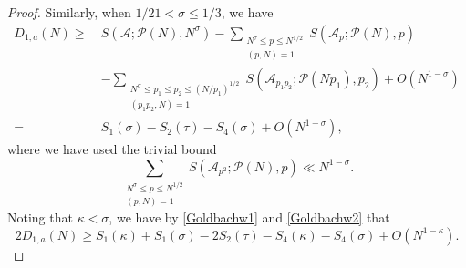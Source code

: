 \documentclass[12pt, a4paper]{amsart}
\def\le{\leqslant}
\def\ge{\geqslant}
\theoremstyle{plain}
\theoremstyle{remark}
\numberwithin{equation}{section}
\begin{document}
\begin{proof}
Similarly, when $1/21<\sigma\le 1/3$, we have
\begin{equation}\label{Goldbachw2}
\begin{split}
D_{1,a}(N)
\ge\ 
& S(\mathscr{A};\mathscr{P}(N),N^\sigma)-\sum\limits_{\substack{N^\tau\le p\le N^{1/2} \\(p, N)=1}}S(\mathscr{A}_p ; \mathscr{P}(N), p)\\
&-\sum_{\substack{N^\sigma \le p_1 \le p_2 \le (N/p_1)^{1/2} \\ (p_1 p_2, N) = 1}}  S(\mathscr{A}_{p_1 p_2}; \mathscr{P}(N p_1), p_2)+O(N^{1-\sigma})\\
=\ & S_1(\sigma)-S_2(\tau)-S_4(\sigma)+O(N^{1-\sigma}),
		\end{split}	
		\end{equation}
		where we have used the trivial bound
		\begin{equation}\label{Buchstab2}
		\sum_{\substack{N^\sigma \le p \le N^{1/2} \\ (p, N) = 1}} S\left(\mathscr{A}_{p^2} ; \mathscr{P}(N), p\right) \ll N^{1-\sigma}.
		\end{equation}
Noting that $\kappa<\sigma$, we have by \eqref{Goldbachw1} and \eqref{Goldbachw2} that 
\begin{equation}\label{Goldbachw0}
2D_{1,a}(N)\ge S_1(\kappa)+S_1(\sigma)-2S_2(\tau)-S_4(\kappa)-S_4(\sigma)+O(N^{1-\kappa}).
\end{equation}


\end{proof}
\end{document}
